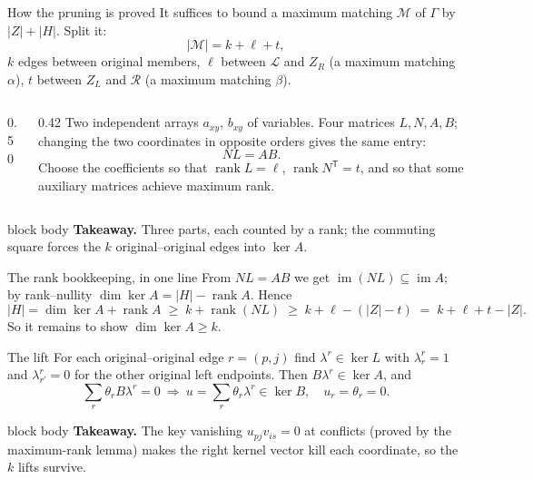 \documentclass[aspectratio=169,11pt]{beamer}
\newcommand{\abs}[1]{\lvert #1\rvert}
\DeclareMathOperator{\rank}{rank}
\DeclareMathOperator{\im}{im}
\newcommand{\takeaway}[1]{%
  \vfill
  \begin{beamercolorbox}[wd=\dimexpr\textwidth-9pt\relax,sep=4pt,rounded=true]{block body}
    \footnotesize\color{mainblue}\textbf{Takeaway.} \color{black}#1
  \end{beamercolorbox}}
\begin{document}
\begin{frame}{How the pruning is proved}
  \small
  It suffices to bound a maximum matching $\mathcal M$ of $\Gamma$ by $\abs Z+\abs H$. Split it:
  \[
    \abs{\mathcal M}=k+\ell+t,
  \]
  $k$ edges between original members, $\ell$ between $\mathcal L$ and $Z_R$ (a maximum matching
  $\alpha$), $t$ between $Z_L$ and $\mathcal R$ (a maximum matching $\beta$).
  \medskip
  \begin{columns}
  \begin{column}{0.50\textwidth}
    \centering
    \scalebox{0.78}{}
  \end{column}
  \begin{column}{0.42\textwidth}
    \footnotesize
    Two independent arrays $a_{xy}$, $b_{xy}$ of variables. Four matrices $L,N,A,B$; changing the
    two coordinates in opposite orders gives the same entry:
    \[ NL=AB. \]
    Choose the coefficients so that $\rank L=\ell$, $\rank N^{\mathsf T}=t$, and so that some
    auxiliary matrices achieve maximum rank.
  \end{column}
  \end{columns}
  \takeaway{Three parts, each counted by a rank; the commuting square forces the $k$
  original--original edges into $\ker A$.}
\end{frame}

\begin{frame}{The rank bookkeeping, in one line}
  \small
  From $NL=AB$ we get $\im(NL)\subseteq\im A$; by rank--nullity
  $\dim\ker A=\abs H-\rank A$. Hence
  \[
    \abs H=\dim\ker A+\rank A
    \;\ge\; k+\rank(NL)
    \;\ge\; k+\ell-(\abs Z-t)
    \;=\;k+\ell+t-\abs Z .
  \]
  So it remains to show $\dim\ker A\ge k$.
  \medskip

  \begin{block}{The lift}
    For each original--original edge $r=(p,j)$ find $\lambda^r\in\ker L$ with $\lambda^r_r=1$ and
    $\lambda^r_{r'}=0$ for the other original left endpoints. Then $B\lambda^r\in\ker A$, and
    \[
      \sum_r\theta_r B\lambda^r=0\ \Longrightarrow\ u=\sum_r\theta_r\lambda^r\in\ker B,\quad
      u_r=\theta_r=0 .
    \]
  \end{block}
  \takeaway{The key vanishing $u_{pj}v_{is}=0$ at conflicts (proved by the maximum-rank lemma)
  makes the right kernel vector kill each coordinate, so the $k$ lifts survive.}
\end{frame}
\end{document}
